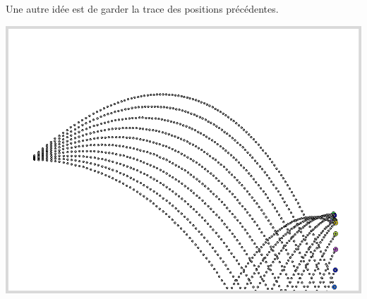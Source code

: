 \documentclass[11pt,class=report,crop=false]{standalone}
\begin{document}
\begin{activite}
Une autre idée est de garder la trace des positions précédentes.
\begin{center}
\includegraphics[scale=\myscale,scale=0.4]{ecran-mouvement-trace}
\end{center}	 

\end{activite}



\end{document}

